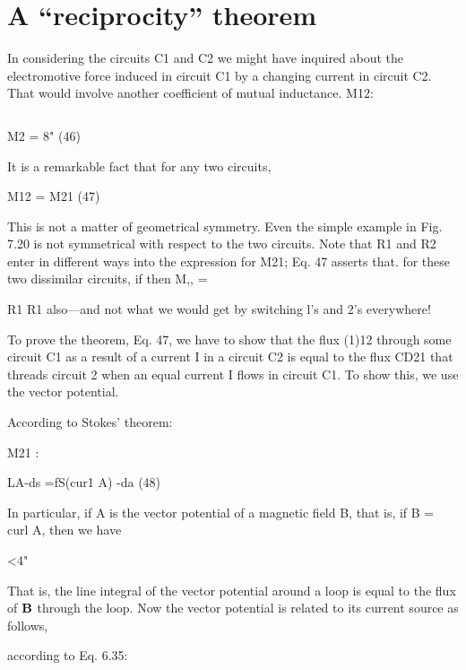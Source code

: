 \section{A ``reciprocity'' theorem}

In considering the circuits C1 and C2 we might have inquired about
the electromotive force induced in circuit C1 by a changing current
in circuit C2. That would involve another coefficient of mutual
inductance. M12:

\begin{equation}
\end{equation}

M2 = 8" (46)

It is a remarkable fact that for any two circuits,

\begin{equation}
\end{equation}
M12 = M21 (47)

This is not a matter of geometrical symmetry. Even the simple
example in Fig. 7.20 is not symmetrical with respect to the two
circuits. Note that R1 and R2 enter in different ways into the expression
for M21; Eq. 47 asserts that. for these two dissimilar circuits, if
 then M,, = 

R1 R1
also---and not what we would get by switching l's and 2's everywhere!

To prove the theorem, Eq. 47, we have to show that the flux (1)12
through some circuit C1 as a result of a current I in a circuit C2 is
equal to the flux CD21 that threads circuit 2 when an equal current I
flows in circuit C1. To show this, we use the vector potential.

According to Stokes' theorem:

\begin{equation}
\end{equation}
M21 :

LA-ds =fS(cur1 A) -da (48)

In particular, if A is the vector potential of a magnetic field B, that is,
if B = curl A, then we have

\begin{equation}
\end{equation}
<4"

That is, the line integral of the vector potential around a loop is equal
to the flux of $\mathbf{B}$ through the loop.
Now the vector potential is related to its current source as follows,

according to Eq. 6.35:

